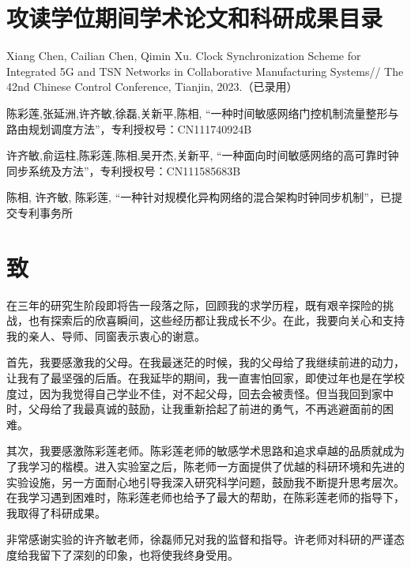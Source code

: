 \documentclass[UTF8,a4paper,12pt]{ctexart}
\numberwithin{equation}{section}
\begin{document}
	
	
	
	
	\newpage
	
	\section*{攻读学位期间学术论文和科研成果目录}
	\noindent
	[1] Xiang Chen, Cailian Chen, Qimin Xu. Clock Synchronization Scheme for Integrated 5G and TSN Networks in Collaborative Manufacturing Systems//
	The 42nd Chinese Control Conference, Tianjin, 2023.（已录用）
	
	\noindent
	[2]陈彩莲,张延洲,许齐敏,徐磊,关新平,陈相, “一种时间敏感网络门控机制流量整形与路由规划调度方法”，专利授权号：CN111740924B
	
	\noindent
	[3]许齐敏,俞运柱,陈彩莲,陈相,吴开杰,关新平, “一种面向时间敏感网络的高可靠时钟同步系统及方法”，专利授权号：CN111585683B
	
	\noindent
	[4]陈相, 许齐敏, 陈彩莲, “一种针对规模化异构网络的混合架构时钟同步机制”，已提交专利事务所
	
	\newpage
	
	\section*{致}
	\hspace{8mm}
	
	在三年的研究生阶段即将告一段落之际，回顾我的求学历程，既有艰辛探险的挑战，也有探索后的欣喜瞬间，这些经历都让我成长不少。在此，我要向关心和支持我的亲人、导师、同窗表示衷心的谢意。
	
	首先，我要感激我的父母。在我最迷茫的时候，我的父母给了我继续前进的动力，让我有了最坚强的后盾。在我延毕的期间，我一直害怕回家，即使过年也是在学校度过，因为我觉得自己学业不佳，对不起父母，回去会被责怪。但当我回到家中时，父母给了我最真诚的鼓励，让我重新拾起了前进的勇气，不再逃避面前的困难。
	
	其次，我要感激陈彩莲老师。陈彩莲老师的敏感学术思路和追求卓越的品质就成为了我学习的楷模。进入实验室之后，陈老师一方面提供了优越的科研环境和先进的实验设施，另一方面耐心地引导我深入研究科学问题，鼓励我不断提升思考层次。在我学习遇到困难时，陈彩莲老师也给予了最大的帮助，在陈彩莲老师的指导下，我取得了科研成果。
	
	非常感谢实验的许齐敏老师，徐磊师兄对我的监督和指导。许老师对科研的严谨态度给我留下了深刻的印象，也将使我终身受用。
	
\end{document}
